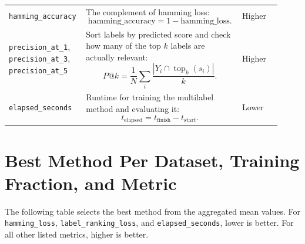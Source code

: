 \documentclass[11pt]{article}
\begin{document}
\begin{longtable}{p{0.23\linewidth} p{0.55\linewidth} p{0.14\linewidth}}
\texttt{hamming\_accuracy}
&
The complement of hamming loss:
\[
\mathrm{hamming\_accuracy} = 1 - \mathrm{hamming\_loss}.
\]
&
Higher
\\
\addlinespace

\texttt{precision\_at\_1}, \texttt{precision\_at\_3}, \texttt{precision\_at\_5}
&
Sort labels by predicted score and check how many of the top $k$ labels are
actually relevant:
\[
P@k = \frac{1}{N}\sum_i
\frac{|Y_i \cap \operatorname{top}_k(s_i)|}{k}.
\]
&
Higher
\\
\addlinespace

\texttt{elapsed\_seconds}
&
Runtime for training the multilabel method and evaluating it:
\[
t_{\mathrm{elapsed}} = t_{\mathrm{finish}} - t_{\mathrm{start}}.
\]
&
Lower
\\

\bottomrule
\end{longtable}

\section{Best Method Per Dataset, Training Fraction, and Metric}

The following table selects the best method from the aggregated mean values.
For \texttt{hamming\_loss}, \texttt{label\_ranking\_loss}, and
\texttt{elapsed\_seconds}, lower is better. For all other listed metrics,
higher is better.
\end{document}
